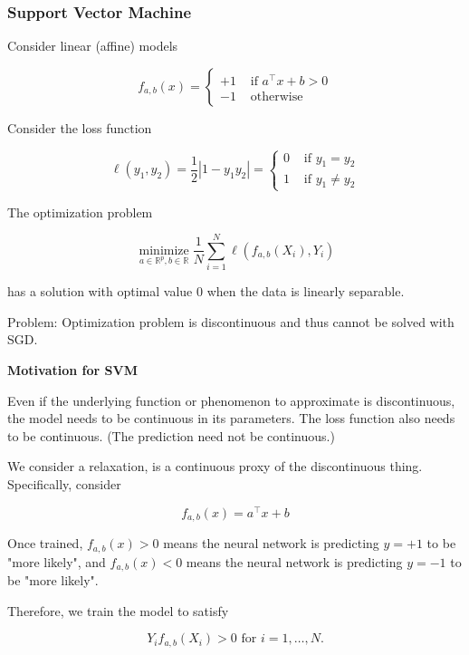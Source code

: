 \documentclass{beamer}
\begin{document}
\subsubsection{Support Vector Machine   }


\begin{frame}[allowframebreaks]

Consider linear (affine) models

$$
f_{a, b}(x)= \begin{cases}+1 & \text { if } a^{\top} x+b>0 \\ -1 & \text { otherwise }\end{cases}
$$

Consider the loss function

$$
\ell\left(y_{1}, y_{2}\right)=\frac{1}{2}\left|1-y_{1} y_{2}\right|= \begin{cases}0 & \text { if } y_{1}=y_{2} \\ 1 & \text { if } y_{1} \neq y_{2}\end{cases}
$$

The optimization problem

$$
\underset{a \in \mathbb{R}^{p}, b \in \mathbb{R}}{\operatorname{minimize}} \frac{1}{N} \sum_{i=1}^{N} \ell\left(f_{a, b}\left(X_{i}\right), Y_{i}\right)
$$

has a solution with optimal value 0 when the data is linearly separable.

Problem: Optimization problem is discontinuous and thus cannot be solved with SGD.

\par\noindent\textcolor{gray}{\hdashrule{\textwidth}{0.4pt}{1pt 2pt}}

\textbf{Motivation for SVM}

Even if the underlying function or phenomenon to approximate is discontinuous, the model needs to be continuous in its parameters. The loss function also needs to be continuous. (The prediction need not be continuous.)

We consider a relaxation, is a continuous proxy of the discontinuous thing. Specifically, consider

$$
f_{a, b}(x)=a^{\top} x+b
$$

Once trained, $f_{a, b}(x)>0$ means the neural network is predicting $y=+1$ to be "more likely", and $f_{a, b}(x)<0$ means the neural network is predicting $y=-1$ to be "more likely".

Therefore, we train the model to satisfy

$$
Y_{i} f_{a, b}\left(X_{i}\right)>0 \text { for } i=1, \ldots, N .
$$


\end{frame}
\end{document}
